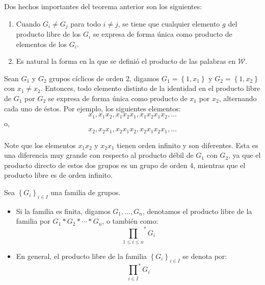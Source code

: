 \documentclass[12pt]{report}
\theoremstyle{largebreak}
\begin{document}
    \begin{obs}
        Dos hechos importantes del teorema anterior son los siguientes:
        \begin{enumerate}[label = \textit{(\alph*)}]
            \item Cuando $G_i\neq G_j$ para todo $i\neq j$, se tiene que cualquier elemento $g$ del producto libre de los $G_i$ se expresa de forma única como producto de elementos de los $G_i$.
            \item Es natural la forma en la que se definió el producto de las palabras en $\mathscr{W}$.
        \end{enumerate}
    \end{obs}

    \begin{exa}
        Sean $G_1$ y $G_2$ grupos cíclicos de orden 2, digamos $G_1=\left\{1,x_1 \right\}$ y $G_2=\left\{1,x_2 \right\}$ con $x_1\neq x_2$. Entonces, todo elemento distinto de la identidad en el producto libre de $G_1$ por $G_2$ se expresa de forma única como producto de $x_1$ por $x_2$, alternando cada uno de éstos. Por ejemplo, los siguientes elementos:
        \begin{equation*}
            x_1,x_1x_2,x_1x_2x_1,x_1x_2x_1x_2,...
        \end{equation*}
        o,
        \begin{equation*}
            x_2,x_2 x_1,x_2x_1x_2,x_2x_1x_2x_1,...
        \end{equation*}

        Note que los elementos $x_1x_2$ y $x_2x_1$ tienen orden infinito y son diferentes. Esta es una diferencia muy grande con respecto al producto débil de $G_1$ con $G_2$, ya que el producto directo de estos dos grupos es un grupo de orden 4, mientras que el producto libre es de orden infinito.
    \end{exa}

    \begin{mydef}
        Sea $\left\{G_i \right\}_{ i\in I}$ una familia de grupos.
        \begin{itemize}
            \item Si la familia es finita, digamos $G_1,...,G_n$, denotamos el producto libre de la familia por $G_1*G_2*\cdots*G_n$, o también como:
            \begin{equation*}
                {\prod_{ 1\leq i\leq n}}^*G_i
            \end{equation*}
            \item En general, el producto libre de la familia $\left\{G_i \right\}_{ i\in I}$ se denota por:
            \begin{equation*}
                {\prod_{ i\in I}}^*G_i
            \end{equation*}
        \end{itemize}
    \end{mydef}
    
\end{document}
